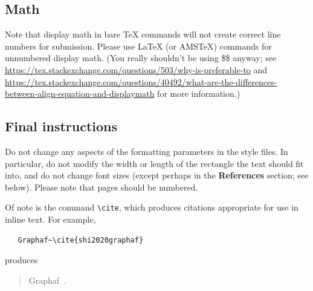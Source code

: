 \documentclass{article}
\begin{document}
\subsection{Math}
Note that display math in bare TeX commands will not create correct line numbers for submission. Please use LaTeX (or AMSTeX) commands for unnumbered display math. (You really shouldn't be using \$\$ anyway; see \url{https://tex.stackexchange.com/questions/503/why-is-preferable-to} and \url{https://tex.stackexchange.com/questions/40492/what-are-the-differences-between-align-equation-and-displaymath} for more information.)

\subsection{Final instructions}

Do not change any aspects of the formatting parameters in the style files.  In
particular, do not modify the width or length of the rectangle the text should
fit into, and do not change font sizes (except perhaps in the
\textbf{References} section; see below). Please note that pages should be
numbered.

Of note is the command \verb+\cite+, which produces citations appropriate for
use in inline text.  For example,
\begin{verbatim}
   Graphaf~\cite{shi2020graphaf}
\end{verbatim}
produces
\begin{quote}
  Graphaf~\cite{shi2020graphaf}.
\end{quote}

\newpage




\end{document}
